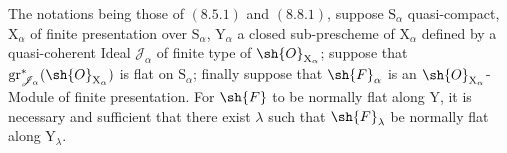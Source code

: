 \begin{proposition}[11.3.6]
\label{IV.11.3.6}
The notations being those of $(8.5.1)$ and $(8.8.1)$, suppose $\mathrm{S}_\alpha$ quasi-compact, $\mathrm{X}_\alpha$ of finite presentation over $\mathrm{S}_\alpha$, $\mathrm{Y}_\alpha$ a closed sub-prescheme of $\mathrm{X}_\alpha$ defined by a quasi-coherent Ideal $\mathscr{J}_\alpha$ of finite type of $\sh{O}_{\mathrm{X}_\alpha}$; suppose that $\operatorname{gr}^*_{\mathscr{J}_\alpha}(\sh{O}_{\mathrm{X}_\alpha})$ is flat on $\mathrm{S}_\alpha$; finally suppose that $\sh{F}_\alpha$ is an $\sh{O}_{\mathrm{X}_\alpha}$-Module of finite presentation. For $\sh{F}$ to be normally flat along $\mathrm{Y}$, it is necessary and sufficient that there exist $\lambda$ such that $\sh{F}_\lambda$ be normally flat along $\mathrm{Y}_\lambda$.
\end{proposition}

